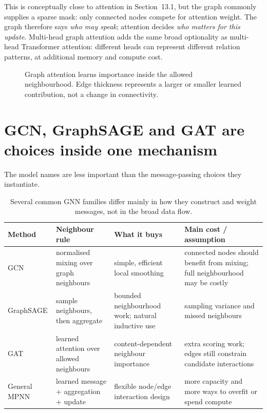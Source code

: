 This is conceptually close to attention in Section~13.1, but the graph commonly supplies a sparse mask: only connected nodes compete for attention weight.
The graph therefore says \emph{who may speak}; attention decides \emph{who matters for this update}.
Multi-head graph attention adds the same broad optionality as multi-head Transformer attention: different heads can represent different relation patterns, at additional memory and compute cost.

\begin{figure}[htbp]
\centering
{}
\caption{Graph attention learns importance inside the allowed neighbourhood. Edge thickness represents a larger or smaller learned contribution, not a change in connectivity.}
\label{fig:gnn-gat}
\end{figure}

\section{GCN, GraphSAGE and GAT are choices inside one mechanism}
The model names are less important than the message-passing choices they instantiate.

\begin{table}[htbp]
\centering
\small
\begin{tabular}{p{}p{}p{}p{}}
\toprule
Method & Neighbour rule & What it buys & Main cost / assumption \\
\midrule
GCN & normalised mixing over graph neighbours & simple, efficient local smoothing & connected nodes should benefit from mixing; full neighbourhood may be costly \\
GraphSAGE & sample neighbours, then aggregate & bounded neighbourhood work; natural inductive use & sampling variance and missed neighbours \\
GAT & learned attention over allowed neighbours & content-dependent neighbour importance & extra scoring work; edges still constrain candidate interactions \\
General MPNN & learned message + aggregation + update & flexible node/edge interaction design & more capacity and more ways to overfit or spend compute \\
\bottomrule
\end{tabular}
\caption{Several common GNN families differ mainly in how they construct and weight messages, not in the broad data flow.}
\label{tab:gnn-families}
\end{table}

